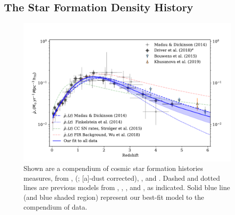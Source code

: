 \documentclass[apj, twocolumn]{aastex62}
\begin{document}
\subsection{The Star Formation Density History}\label{sec:csfh}
\begin{figure}[t]
   \centering
   \includegraphics[width=6.1in]{figure_csfh_today.pdf}
   \caption{\footnotesize Shown are a compendium of cosmic star formation histories measures, from \cite{Madau:2014fk}, \citeauthor{Driver:2018nr} (\citeyear{Driver:2018nr}; [a]-dust corrected), \cite{Bouwens:2015qy}, and \cite{Khusanova:2019kx}. Dashed and dotted lines are previous models from \cite{Madau:2014fk}, \cite{Finkelstein:2014fj}, \cite{Strolger:2015aa}, {and \cite{Wu:2018qy}}, as indicated. Solid blue line (and blue shaded region) represent our best-fit model to the compendium of data.}
   \label{fig:csfhs}
\end{figure}
\end{document}
